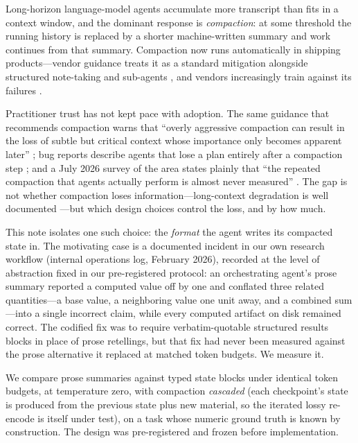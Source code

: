 \documentclass[11pt]{article}
\begin{document}
Long-horizon language-model agents accumulate more transcript than fits in a
context window, and the dominant response is \emph{compaction}: at some
threshold the running history is replaced by a shorter machine-written
summary and work continues from that summary. Compaction now runs
automatically in shipping products---vendor guidance treats it as a standard
mitigation alongside structured note-taking and sub-agents
\citep{anthropic2025context}, and vendors increasingly train against its
failures \citep{cassano2026composer}.

Practitioner trust has not kept pace with adoption. The same guidance that
recommends compaction warns that ``overly aggressive compaction can result in
the loss of subtle but critical context whose importance only becomes
apparent later'' \citep{anthropic2025context}; bug reports describe agents
that lose a plan entirely after a compaction step
\citep{claudecode24686}; and a July 2026 survey of the area states
plainly that ``the repeated compaction that agents actually perform is almost
never measured'' \citep{colaco2026ratedistortion}. The gap is not whether
compaction loses information---long-context degradation is well documented
\citep{liu2023lost,hong2025contextrot}---but which design choices control the
loss, and by how much.

This note isolates one such choice: the \emph{format} the agent writes its
compacted state in. The motivating case is a documented incident in our own
research workflow (internal operations log, February 2026), recorded at the
level of abstraction fixed in our pre-registered protocol: an orchestrating
agent's prose summary reported a computed value off by one and conflated
three related quantities---a base value, a neighboring value one unit away,
and a combined sum---into a single incorrect claim, while every computed
artifact on disk remained correct. The codified fix was to require
verbatim-quotable structured results blocks in place of prose retellings, but
that fix had never been measured against the prose alternative it replaced at
matched token budgets. We measure it.

We compare prose summaries against typed state blocks under identical token
budgets, at temperature zero, with compaction \emph{cascaded} (each
checkpoint's state is produced from the previous state plus new material, so
the iterated lossy re-encode is itself under test), on a task whose numeric
ground truth is known by construction. The design was pre-registered and
frozen before implementation.
\end{document}

